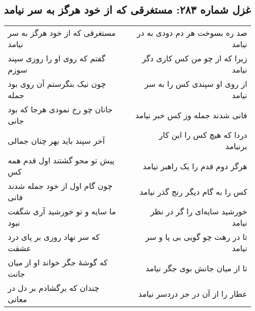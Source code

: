 \begin{center}
\section*{غزل شماره ۲۸۳: مستغرقی که از خود هرگز به سر نیامد}
\label{sec:283}
\begin{longtable}{l p{0.5cm} r}
مستغرقی که از خود هرگز به سر نیامد
&&
صد ره بسوخت هر دم دودی به در نیامد
\\
گفتم که روی او را روزی سپند سوزم
&&
زیرا که از چو من کس کاری دگر نیامد
\\
چون نیک بنگرستم آن روی بود جمله
&&
از روی او سپندی کس را به سر نیامد
\\
جانان چو رخ نمودی هرجا که بود جانی
&&
فانی شدند جمله وز کس خبر نیامد
\\
آخر سپند باید بهر چنان جمالی
&&
دردا که هیچ کس را این کار برنیامد
\\
پیش تو محو گشتند اول قدم همه کس
&&
هرگز دوم قدم را یک راهبر نیامد
\\
چون گام اول از خود جمله شدند فانی
&&
کس را به گام دیگر رنج گذر نیامد
\\
ما سایه و تو خورشید آری شگفت نبود
&&
خورشید سایه‌ای را گر در نظر نیامد
\\
که سر نهاد روزی بر پای درد عشقت
&&
تا در رهت چو گویی بی پا و سر نیامد
\\
که گوشهٔ جگر خواند او از میان جانت
&&
تا از میان جانش بوی جگر نیامد
\\
چندان که برگشادم بر دل در معانی
&&
عطار را از آن در جز دردسر نیامد
\\
\end{longtable}
\end{center}
